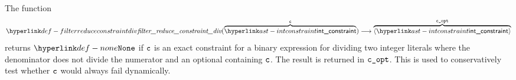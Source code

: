 \begin{mathpar}
\end{mathpar}

\hypertarget{def-filterreduceconstraintdiv}{}
The function
\[
\filterreduceconstraintdiv(\overname{\intconstraint}{\vc}) \aslto \overname{\langle\intconstraint\rangle}{\vcopt}
\]
returns $\None$ if $\vc$ is an exact constraint for a binary expression for dividing two integer literals
where the denominator does not divide the numerator and an optional containing $\vc$.
The result is returned in $\vcopt$.
This is used to conservatively test whether $\vc$ would always fail dynamically.

